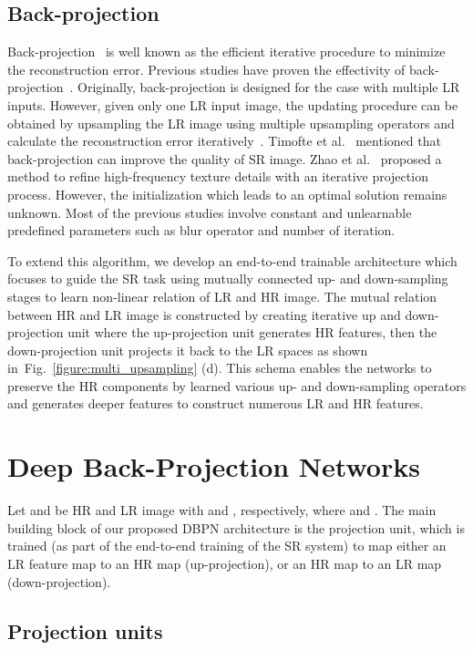 \documentclass[10pt,twocolumn,letterpaper]{article}
\begin{document}
\subsection{Back-projection} 
Back-projection~\cite{irani1991improving} is well known as the efficient iterative procedure to minimize the reconstruction error. Previous studies have proven the effectivity of back-projection~\cite{zhao2017iterative, haris2017first, dong2009nonlocal, timofte2016seven}. Originally, back-projection is designed for the case with multiple LR inputs. However, given only one LR input image, the updating procedure can be obtained by upsampling the LR image using multiple upsampling operators and calculate the reconstruction error iteratively~\cite{dai2007bilateral}. Timofte et al.~\cite{timofte2016seven} mentioned that back-projection can improve the quality of SR image. Zhao et al.~\cite{zhao2017iterative} proposed a method to refine high-frequency texture details with an iterative projection process. However, the initialization which leads to an optimal solution remains unknown. Most of the previous studies involve constant and unlearnable predefined parameters such as blur operator and number of iteration. 

To extend this algorithm, we develop an end-to-end trainable architecture which focuses to guide the SR task using mutually connected up- and down-sampling stages to learn non-linear relation of LR and HR image. The mutual relation between HR and LR image is constructed by creating iterative up and down-projection unit where the up-projection unit generates HR features, then the down-projection unit projects it back to the LR spaces as shown in~Fig.~\ref{figure:multi_upsampling} (d).
This schema enables the networks to preserve the HR components by learned various up- and down-sampling operators and generates deeper features to construct numerous LR and HR features.  


\section{Deep Back-Projection Networks} 
\label{sec:proposed}
Let  and  be HR and LR image with   and , respectively, where  and . The main building block of our proposed DBPN architecture is the
projection unit, which is trained (as part of the end-to-end training
of the SR system) to map either an LR feature map to an HR map
(up-projection), or an HR map to an LR map (down-projection). 

\subsection{Projection units}
\end{document}
